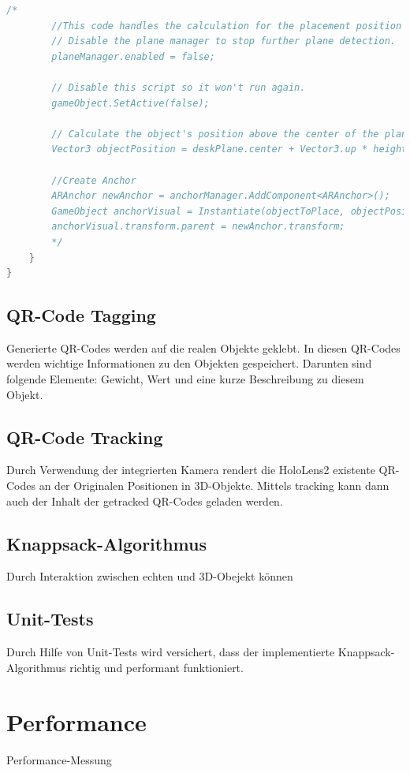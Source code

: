 \begin{lstlisting}[language=C#, style=csharpstyle, caption=3D Objekt in der echten Welt platzieren]
        /*
        //This code handles the calculation for the placement position and also attaches an ARAnchor to the placed Object
        // Disable the plane manager to stop further plane detection.
        planeManager.enabled = false;

        // Disable this script so it won't run again.
        gameObject.SetActive(false);

        // Calculate the object's position above the center of the plane.
        Vector3 objectPosition = deskPlane.center + Vector3.up * heightOffset;

        //Create Anchor
        ARAnchor newAnchor = anchorManager.AddComponent<ARAnchor>();
        GameObject anchorVisual = Instantiate(objectToPlace, objectPosition, Quaternion.identity);
        anchorVisual.transform.parent = newAnchor.transform;
        */
    }
}

\end{lstlisting}

\subsection{QR-Code Tagging}
Generierte QR-Codes werden auf die realen Objekte geklebt. In diesen QR-Codes werden
wichtige Informationen zu den Objekten gespeichert. Darunten sind folgende Elemente:
Gewicht, Wert und eine kurze Beschreibung zu diesem Objekt.

\subsection{QR-Code Tracking}
Durch Verwendung der integrierten Kamera rendert die HoloLens2 existente QR-Codes an
der Originalen Positionen in 3D-Objekte. Mittels tracking kann dann auch der Inhalt
der getracked QR-Codes geladen werden.

\subsection{Knappsack-Algorithmus}
Durch Interaktion zwischen echten und 3D-Obejekt können

\subsection{Unit-Tests}
Durch Hilfe von Unit-Tests wird versichert, dass der implementierte Knappsack-Algorithmus
richtig und performant funktioniert.

\section{Performance}
Performance-Messung
